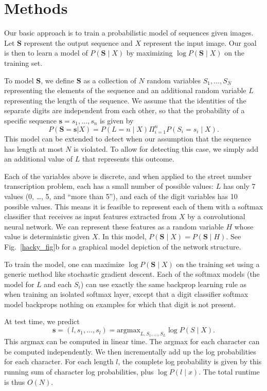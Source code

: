 \documentclass{article} \usepackage{comment}
\begin{document}
\section{Methods}
\label{sec:methods}

Our basic approach is to train a probabilistic model of sequences given images. Let $\mathbf{S}$ represent
the output sequence and $X$ represent the input image. Our goal is then to learn a model of $P(\mathbf{S} \mid X)$
by maximizing $\log P(\mathbf{S} \mid X)$ on the training set.

To model $\mathbf{S}$, we define $\mathbf{S}$ as a collection of $N$ random variables $S_1, \dots, S_N$ representing
the elements of the sequence and an additional random variable $L$ representing the length of the sequence.
We assume that the identities of the separate digits are independent from each other, so that the probability of a specific
sequence $\mathbf{s} = s_1, \dots, s_n$ is given by
\[ P(\mathbf{S} = \mathbf{s} | X) = P(L = n \mid X) \Pi_{i=1}^n P(S_i = s_i \mid X). \]
This model can be extended to
detect when our assumption that
the sequence has length at most $N$ is violated. To allow for detecting this case, we simply add an additional
value of $L$ that represents this outcome.

Each of the variables above is discrete, and when applied to the street number transcription problem, each has a small number
of possible values: $L$ has only 7 values (0, \dots, 5, and ``more than 5''), and each of the digit variables has 10 possible values.
This means it is feasible to represent each of them with a softmax classifier that receives as input
features extracted from $X$ by a convolutional neural network. We can represent these features as a random variable $H$
whose value is deterministic given $X$. In this model, $P(\mathbf{S} \mid X) = P(\mathbf{S} \mid H).$ See Fig.~\ref{hacky_fig}b for a graphical
model depiction of the network structure.


To train the model, one can maximize $\log P(\mathbf{S} \mid X)$ on the training set using a generic method like stochastic
gradient descent. Each of the softmax models (the model for $L$ and each $S_i$)
can use exactly the same backprop learning rule as when training an isolated softmax layer,
except that a digit classifier softmax model backprops nothing on examples for which that
digit is not present.

At test time, we predict
\[\mathbf{s} = (l, s_1, \dots, s_l) =  \text{argmax}_{L, S_1, \dots, S_L} \log P(S \mid X).\]
This argmax can be computed in
linear time. The argmax for each character can be computed independently. We then incrementally add up
the log probabilities for each character. For each length $l$, the complete log probability is given
by this running sum of character log probabilities, plus $\log P(l \mid x)$. The total runtime is thus $O(N).$
\end{document}
